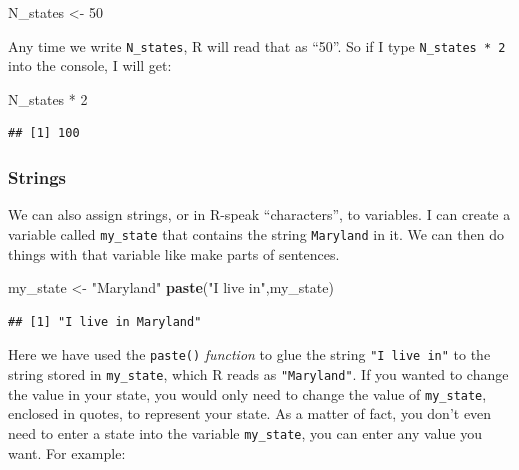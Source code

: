 \documentclass[]{article}
\newenvironment{Shaded}{\begin{snugshade}}{\end{snugshade}}
\newcommand{\KeywordTok}[1]{\textcolor[rgb]{0.13,0.29,0.53}{\textbf{{#1}}}}
\newcommand{\DecValTok}[1]{\textcolor[rgb]{0.00,0.00,0.81}{{#1}}}
\newcommand{\StringTok}[1]{\textcolor[rgb]{0.31,0.60,0.02}{{#1}}}
\newcommand{\NormalTok}[1]{{#1}}
\begin{document}
\begin{Shaded}
\begin{Highlighting}[]
\NormalTok{N_states <-}\StringTok{ }\DecValTok{50}
\end{Highlighting}
\end{Shaded}

Any time we write \texttt{N\_states}, R will read that as ``50''. So if
I type \texttt{N\_states\ *\ 2} into the console, I will get:

\begin{Shaded}
\begin{Highlighting}[]
\NormalTok{N_states *}\StringTok{ }\DecValTok{2}
\end{Highlighting}
\end{Shaded}

\begin{verbatim}
## [1] 100
\end{verbatim}

\hypertarget{vars_string}{\subsubsection{Strings}\label{vars_string}}

We can also assign strings, or in R-speak ``characters'', to variables.
I can create a variable called \texttt{my\_state} that contains the
string \texttt{Maryland} in it. We can then do things with that variable
like make parts of sentences.

\begin{Shaded}
\begin{Highlighting}[]
\NormalTok{my_state <-}\StringTok{ "Maryland"}
\KeywordTok{paste}\NormalTok{(}\StringTok{"I live in"}\NormalTok{,my_state)}
\end{Highlighting}
\end{Shaded}

\begin{verbatim}
## [1] "I live in Maryland"
\end{verbatim}

Here we have used the \texttt{paste()} \emph{function} to glue the
string \texttt{"I\ live\ in"} to the string stored in
\texttt{my\_state}, which R reads as \texttt{"Maryland"}. If you wanted
to change the value in your state, you would only need to change the
value of \texttt{my\_state}, enclosed in quotes, to represent your
state. As a matter of fact, you don't even need to enter a state into
the variable \texttt{my\_state}, you can enter any value you want. For
example:
\end{document}
